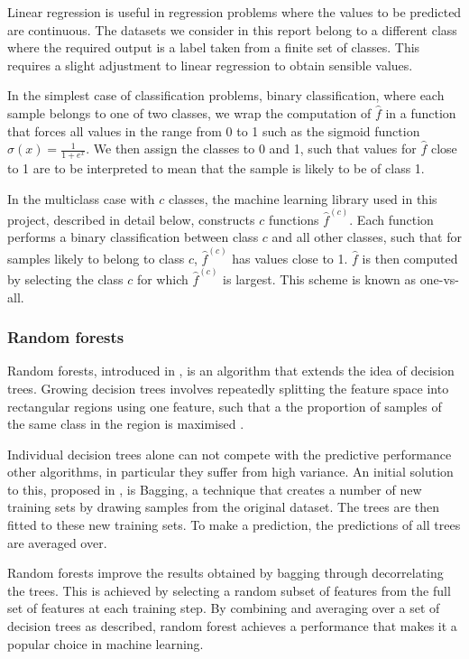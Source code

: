 \documentclass[a4paper,12pt,twoside,openright]{report}
\begin{document}
Linear regression is useful in regression problems where the values to be predicted are continuous. The datasets we consider in this report belong to a different class where the required output is a label taken from a finite set of classes. This requires a slight adjustment to linear regression to obtain sensible values.

In the simplest case of classification problems, binary classification, where each sample belongs to one of two classes, we wrap the computation of $\hat{f}$ in a function that forces all values in the range from 0 to 1 such as the sigmoid function $\sigma(x) = \frac{1}{1+e^x}$. We then assign the classes to 0 and 1, such that values for $\hat{f}$ close to 1 are to be interpreted to mean that the sample is likely to be of class 1.

In the multiclass case with $c$ classes, the machine learning library used in this project, described in detail below, constructs $c$ functions $\hat{f}^{(c)}$. Each function performs a binary classification between class $c$ and all other classes, such that for samples likely to belong to class $c$, $\hat{f}^{(c)}$ has values close to 1. $\hat{f}$ is then computed by selecting the class $c$ for which $\hat{f}^{(c)}$ is largest. This scheme is known as one-vs-all.

\subsubsection{Random forests}
Random forests, introduced in \cite{rndforests}, is an algorithm that extends the idea of decision trees. Growing decision trees involves repeatedly splitting the feature space into rectangular regions using one feature, such that a the proportion of samples of the same class in the region is maximised \cite{james2014introduction}. 

Individual decision trees alone can not compete with the predictive performance other algorithms, in particular they suffer from high variance. An initial solution to this, proposed in \cite{bagging}, is Bagging, a technique that creates a number of new training sets by drawing samples from the original dataset. The trees are then fitted to these new training sets. To make a prediction, the predictions of all trees are averaged over.

Random forests improve the results obtained by bagging through decorrelating the trees. This is achieved by selecting a random subset of features from the full set of features at each training step. By combining and averaging over a set of decision trees as described, random forest achieves a performance that makes it a popular choice in machine learning.
\end{document}
